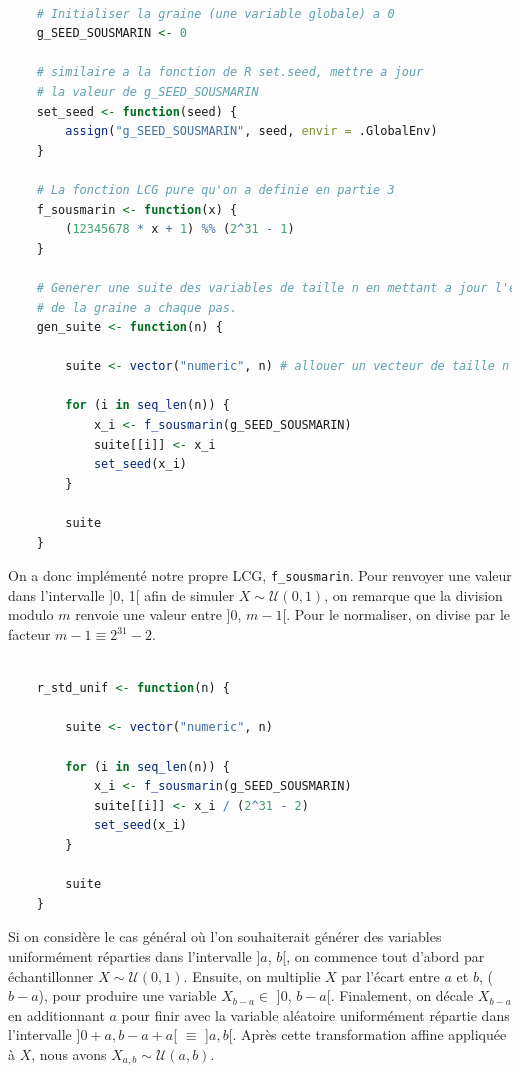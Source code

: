 \documentclass[10pt]{article} %
\begin{document}

\begin{lstlisting}[language =R]

    # Initialiser la graine (une variable globale) a 0
    g_SEED_SOUSMARIN <- 0

    # similaire a la fonction de R set.seed, mettre a jour
    # la valeur de g_SEED_SOUSMARIN
    set_seed <- function(seed) {
        assign("g_SEED_SOUSMARIN", seed, envir = .GlobalEnv)
    }

    # La fonction LCG pure qu'on a definie en partie 3
    f_sousmarin <- function(x) {
        (12345678 * x + 1) %% (2^31 - 1)
    }

    # Generer une suite des variables de taille n en mettant a jour l'etat
    # de la graine a chaque pas.
    gen_suite <- function(n) {

        suite <- vector("numeric", n) # allouer un vecteur de taille n

        for (i in seq_len(n)) {
            x_i <- f_sousmarin(g_SEED_SOUSMARIN)
            suite[[i]] <- x_i
            set_seed(x_i)
        }

        suite
    }
\end{lstlisting}

On a donc implémenté notre propre LCG, \texttt{f\_sousmarin}. Pour renvoyer une valeur dans l'intervalle ]0, 1[ afin de simuler $X \sim \mathcal{U}(0, 1)$, on remarque que
la division modulo $m$ renvoie une valeur entre ]0, $m - 1$[. Pour le normaliser, on divise par le facteur $m - 1 \equiv 2^{31} - 2$.

\begin{lstlisting}[language=R]

    r_std_unif <- function(n) {

        suite <- vector("numeric", n)

        for (i in seq_len(n)) {
            x_i <- f_sousmarin(g_SEED_SOUSMARIN)
            suite[[i]] <- x_i / (2^31 - 2)
            set_seed(x_i)
        }

        suite
    }

\end{lstlisting}

Si on considère le cas général où l'on souhaiterait générer des variables uniformément réparties dans l'intervalle ]$a$, $b$[, on commence tout d'abord
par échantillonner $X \sim \mathcal{U}(0, 1)$. Ensuite, on multiplie $X$ par l'écart entre $a$ et $b$, ($b - a$), pour produire une variable $X_{b - a} \in$ ]$0$, $b - a$[. Finalement,
on décale $X_{b - a}$ en additionnant $a$ pour finir avec la variable aléatoire uniformément répartie dans l'intervalle ]$0 + a, b - a + a$[ $\equiv $ ]$a, b$[. Après cette transformation affine appliquée à
$X$, nous avons $X_{a,b} \sim \mathcal{U}(a, b)$.
\end{document}
